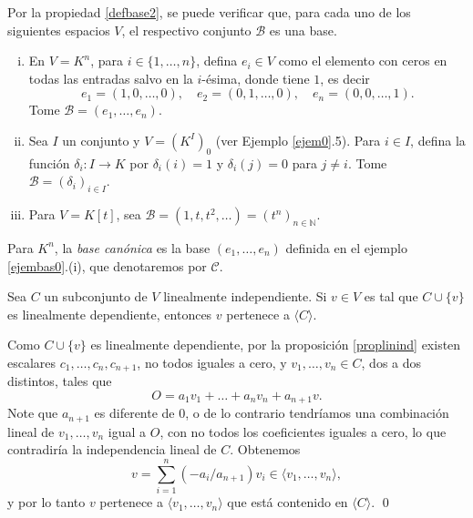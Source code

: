 \begin{ejem}\label{ejembas0}
Por la propiedad \ref{defbase2}, se puede verificar que, para cada uno de los siguientes espacios $V$, el respectivo conjunto $\mathcal{B}$ es una base.
\begin{enumerate}[(i)]
\item En $V=K^n$, para $i\in\{1,\ldots, n\}$, defina $e_i\in V$ como el elemento con ceros en todas las entradas salvo en la $i$-\'esima, donde tiene $1$, es decir
$$e_1=(1,0,\ldots,0),\quad e_2=(0,1,\ldots,0),\quad e_n=(0,0,\ldots,1).$$
Tome $\mathcal{B}=(e_1,\ldots,e_n)$.
\item Sea $I$ un conjunto y $V=\left(K^I\right)_0$ (ver Ejemplo \ref{ejem0}.5). Para $i\in I$, defina la funci\'on $\delta_i: I\rightarrow K$ por $\delta_i(i)=1$ y $\delta_i(j)=0$ para $j\ne i$. Tome $\mathcal{B}=(\delta_i)_{i\in I}$. 
\item Para $V=K[t]$, sea $\mathcal{B}=(1,t,t^2,\ldots)=(t^n)_{n\in\mathbb{N}}$.
\end{enumerate}
\end{ejem}

\begin{nota}
Para $K^n$, la \emph{base can\'onica} es la base $(e_1,\ldots,e_n)$ definida en el ejemplo \ref{ejembas0}.(i), que denotaremos por $\mathcal{C}$.
\end{nota}

\begin{lema}\label{inddep}
Sea $C$ un subconjunto de $V$ linealmente independiente. Si $v\in V$ es tal que $C\cup\{v\}$ es linealmente dependiente, entonces $v$ pertenece a $\langle C\rangle$.
\end{lema}

\dem Como $C\cup\{v\}$ es linealmente dependiente, por la proposici\'on \ref{proplinind} existen escalares $c_1,\ldots,c_n,c_{n+1}$, no todos iguales a cero, y $v_1,\ldots,v_n\in C$, dos a dos distintos, tales que
\[
O=a_1v_1+\ldots+a_nv_n+a_{n+1}v.
\]
Note que $a_{n+1}$ es diferente de $0$, o de lo contrario tendr\'iamos una combinaci\'on lineal de $v_1,\ldots,v_n$ igual a $O$, con no todos los coeficientes iguales a cero, lo que contradiría la independencia lineal de $C$. Obtenemos
\[
v=\sum_{i=1}^n(-a_i/a_{n+1})v_i\in\langle v_1,\ldots,v_n\rangle,
\]
y por lo tanto $v$ pertenece a $\langle v_1,\ldots,v_n\rangle$ que está contenido en $\langle C\rangle$. \qed


